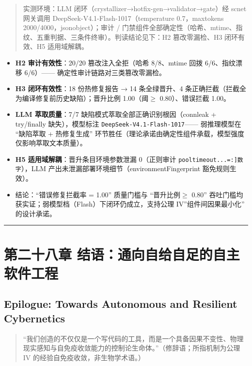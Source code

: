 \documentclass[
]{ctexart}
\renewcommand{\_}{\discretionary{}{}{\textunderscore}}
\let\oldsection\section
\renewcommand{\section}{\clearpage\oldsection}
\begin{document}
\begin{quote}
实测环境：LLM 闭环（crystallizer→hotfix-gen→validator→gate）经 scnet
网关调用 DeepSeek-V4.1-Flash-1017（temperature 0.7，max\_tokens
2000/4000，json\_object）；审计 /
门禁组件全部确定性（哈希、mtime、指纹、五重判据、三条件终审）。判读结论见下：H2
篡改零漏检、H3 闭环有效、H5 适用域解耦。
\end{quote}

\begin{itemize}
\item
  \textbf{H2 审计有效性}：20/20 篡改注入全拒（哈希 8/8、mtime 回拨
  6/6、指纹漂移 6/6）------ 确定性审计链路对三类篡改零漏检。
\item
  \textbf{H3 闭环有效性}：18 份热修复报告 → 14 条全绿晋升、4
  条正确拦截（拦截全为编译修复前历史缺陷）；晋升比例 1.00（阈\(\ge\)
  0.80）、错误拦截 1.00。
\item
  \textbf{LLM 萃取质量}：7/7 缺陷模式萃取全部正确识别根因（conn\_leak +
  try/finally 缺失），模型标注 \texttt{DeepSeek-V4.1-Flash-1017}------
  弱推理模型在 ``缺陷萃取 + 热修复生成''
  环节胜任（理论承诺由确定性组件承载，模型强度仅影响萃取文本质量）。
\item
  \textbf{H5 适用域解耦}：晋升条目环境参数泄漏 0（正则审计
  \texttt{pool\textbar{}timeout\textbar{}...\textbar{}{[}=:{]}数字}），LLM
  产出未泄漏部署环境细节（environmentFingerprint 豁免规则生效）。
\item
  结论：``错误修复拦截率 = 1.00'' 质量门槛与 ``晋升比例\(\ge\) 0.80''
  吞吐门槛均获实证；弱模型档（Flash）下闭环仍成立，支持公理
  IV''组件间因果最小化'' 的设计承诺。
\end{itemize}

\begin{center}\rule{0.5\linewidth}{0.5pt}\end{center}

\section{第二十八章 结语：通向自给自足的自主软件工程}\label{ux7ed3ux8bedux901aux5411ux81eaux7ed9ux81eaux8db3ux7684ux81eaux4e3bux8f6fux4ef6ux5de5ux7a0b}

\subsection{Epilogue: Towards Autonomous and Resilient
Cybernetics}\label{epilogue-towards-autonomous-and-resilient-cybernetics}

\begin{quote}
``我们创造的不仅仅是一个写代码的工具，而是一个具备因果不变性、物理现实感知与自免疫收敛能力的控制论生命体。''（修辞语；所指机制为公理
IV 的经验自免疫收敛，非生物学术语。）
\end{quote}
\end{document}
